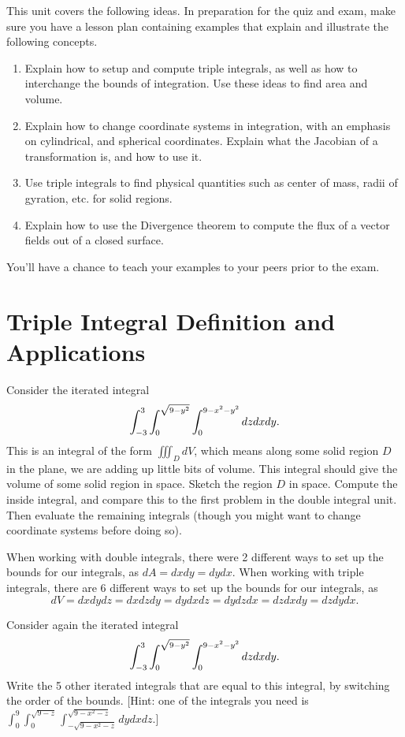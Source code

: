 
\noindent 
This unit covers the following ideas. In preparation for the quiz and exam, make sure you have a lesson plan containing examples that explain and illustrate the following concepts.  
\begin{enumerate}
\item Explain how to setup and compute triple integrals, as well as how to interchange the bounds of integration. Use these ideas to find area and volume.
\item Explain how to change coordinate systems in integration, with an emphasis on cylindrical, and spherical coordinates. Explain what the Jacobian of a transformation is, and how to use it.
\item Use triple integrals to find physical quantities such as center of mass, radii of gyration, etc. for solid regions.
\item Explain how to use the Divergence theorem to compute the flux of a vector fields out of a closed surface.
\end{enumerate}
You'll have a chance to teach your examples to your peers prior to the exam.


\section{Triple Integral Definition and Applications}

\begin{problem}
Consider the iterated integral $$\displaystyle \int_{-3}^3 \int_0^{\sqrt{9-y^2}}\int_0^{9-x^2-y^2} dzdxdy.$$ This is an integral of the form $\iiint_D dV$, which means along some solid region $D$ in the plane, we are adding up little bits of volume. This integral should give the volume of some solid region in space.  Sketch the region $D$ in space.  Compute the inside integral, and compare this to the first problem in the double integral unit.  Then evaluate the remaining integrals (though you might want to change coordinate systems before doing so).
\end{problem}

When working with double integrals, there were 2 different ways to set up the bounds for our integrals, as $dA=dxdy=dydx$.  When working with triple integrals, there are 6 different ways to set up the bounds for our integrals, as $$dV=dxdydz = dxdzdy = dydxdz=dydzdx=dzdxdy=dzdydx.$$ 

\begin{problem}
Consider again the iterated integral $$\displaystyle \int_{-3}^3 \int_0^{\sqrt{9-y^2}}\int_0^{9-x^2-y^2} dzdxdy.$$ Write the 5 other iterated integrals that are equal to this integral, by switching the order of the bounds. [Hint: one of the integrals you need is $\int_0^9\int_0^{\sqrt{9-z}}\int_{-\sqrt{9-x^2-z}}^{\sqrt{9-x^2-z}} dydxdz$.]
\end{problem}

